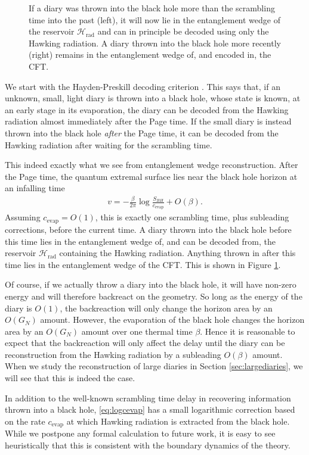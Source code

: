 \documentclass[12pt]{article}
\begin{document}
\begin{figure}[t]
\caption{If a diary was thrown into the black hole more than the scrambling time into the past (left), it will now lie in the entanglement wedge of the reservoir $\mathcal{H}_\text{rad}$ and can in principle be decoded using only the Hawking radiation. A diary thrown into the black hole more recently (right) remains in the entanglement wedge of, and encoded in, the CFT.}
\label{fig:haydenpreskill}
\end{figure}

We start with the Hayden-Preskill decoding criterion \cite{hayden2007black}. This says that, if an unknown, small, light diary is thrown into a black hole, whose state is known, at an early stage in its evaporation, the diary can be decoded from the Hawking radiation almost immediately after the Page time. If the small diary is instead thrown into the black hole \emph{after} the Page time, it can be decoded from the Hawking radiation after waiting for the scrambling time.

This indeed exactly what we see from entanglement wedge reconstruction. After the Page time, the quantum extremal surface lies near the black hole horizon at an infalling time
\begin{align} \label{eq:logcevap}
v = - \frac{\beta}{2 \pi} \log \frac{S_{BH}}{c_\text{evap}} + O(\beta).
\end{align}
Assuming $c_\text{evap} = O(1)$, this is exactly one scrambling time, plus subleading corrections, before the current time. A diary thrown into the black hole before this time lies in the entanglement wedge of, and can be decoded from, the reservoir $\mathcal{H}_\text{rad}$ containing the Hawking radiation. Anything thrown in after this time lies in the entanglement wedge of the CFT. This is shown in Figure \ref{fig:haydenpreskill}.

Of course, if we actually throw a diary into the black hole, it will have non-zero energy and will therefore backreact on the geometry. So long as the energy of the diary is $O(1)$, the backreaction will only change the horizon area by an $O(G_N)$ amount. However, the evaporation of the black hole changes the horizon area by an $O(G_N)$ amount over one thermal time $\beta$. Hence it is reasonable to expect that the backreaction will only affect the delay until the diary can be reconstruction from the Hawking radiation by a subleading $O(\beta)$ amount.
When we study the reconstruction of large diaries in Section \ref{sec:largediaries}, we will see that this is indeed the case.

In addition to the well-known scrambling time delay in recovering information thrown into a black hole, \eqref{eq:logcevap} has a small logarithmic correction based on the rate $c_\text{evap}$ at which Hawking radiation is extracted from the black hole. 
While we postpone any formal calculation to future work, it is easy to see heuristically that this is consistent with the boundary dynamics of the theory. 
\end{document}
